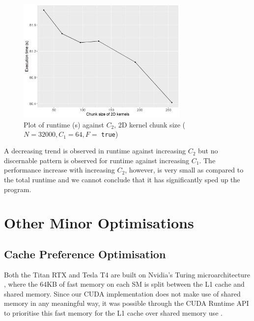 \documentclass[12pt]{article}
\begin{document}
\begin{figure}[H]
    \centering
    \includegraphics[width=0.75\textwidth]{chunkSize-2D-32000-fmad}
    \caption{Plot of runtime (s) against $C_2$, 2D kernel chunk size ($N = 32000, C_1 = 64, F =$ \texttt{true})}
    \label{fig:chunkSize-2D-32000-fmad}
\end{figure}

A decreasing trend is observed in runtime against increasing $C_2$ but no discernable pattern is observed for runtime against increasing $C_1$. The performance increase with increasing $C_2$, however, is very small as compared to the total runtime and we cannot conclude that it has significantly sped up the program.


\pagebreak

\section{Other Minor Optimisations}

\subsection{Cache Preference Optimisation}
\label{subsection:cache-preference-optimisation}

Both the Titan RTX and Tesla T4 are built on Nvidia's Turing microarchitecture \cite{turingarchi}, where the 64KB of fast memory on each SM is split between the L1 cache and shared memory. Since our CUDA implementation does not make use of shared memory in any meaningful way, it was possible through the CUDA Runtime API to prioritise this fast memory for the L1 cache over shared memory use 
\cite{cudaexecutioncontrol}.\\
\end{document}
